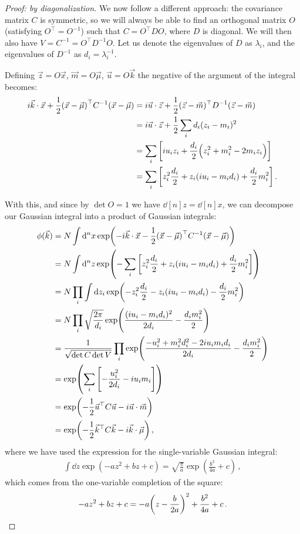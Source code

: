 \documentclass[main.tex]{subfiles}
\begin{document}
\begin{proof}[Proof: by diagonalization]
We now follow a different approach: the covariance matrix \(C\) is symmetric, so we will always be able to find an orthogonal matrix \(O\) (satisfying \(O^{\top} = O^{-1}\)) such that \(C = O^{\top} D O\), where \(D\) is diagonal. 
We will then also have \(V = C^{-1} = O^{\top} D^{-1} O\).
Let us denote the eigenvalues of \(D\) as \(\lambda _i\), and the eigenvalues of \(D^{-1}\) as \(d_i = \lambda _i^{-1}\).

Defining \(\vec{z} = O \vec{x}\), \(\vec{m} = O \vec{\mu}\), \(\vec{u} = O \vec{k}\) the negative of the argument of the integral becomes:
%
\begin{align}
 i \vec{k} \cdot \vec{x} 
 + \frac{1}{2}
\qty(\vec{x} - \vec{\mu})^{\top} C^{-1} 
\qty(\vec{x} - \vec{\mu}) &=
 i \vec{u} \cdot \vec{z} 
+ \frac{1}{2} (\vec{z} - \vec{m})^{\top} D^{-1} (\vec{z} - \vec{m})  \\
&= 
i \vec{u} \cdot \vec{z} 
+ \frac{1}{2} \sum _{i} d_i (z_i - m_i)^2   \\
&= \sum _{i} \qty[i u_i z_i + \frac{d_i}{2} \qty(z_i^2 + m_i^2 - 2 m_i z_i)]  \\
&= \sum _{i} \qty[z_i^2 \frac{d_i}{2} + z_i \qty(i u_i - m_i d_i) + \frac{d_i}{2} m_i^2]
\,.
\end{align}

With this, and since by \(\det O = 1\) we have \(\dd[n]{z} = \dd[n]{x}\), we can decompose our Gaussian integral into a product of Gaussian integrals:
%
\begin{align}
\phi (\vec{k}) &= 
N \int \dd[n]{x} \exp(-  i \vec{k} \cdot \vec{x} 
 - \frac{1}{2}
\qty(\vec{x} - \vec{\mu})^{\top} C^{-1} 
\qty(\vec{x} - \vec{\mu}))  \\
&= N \int \dd[n]{z} \exp(- \sum _{i} \qty[z_i^2 \frac{d_i}{2} + z_i \qty(i u_i - m_i d_i) + \frac{d_i}{2} m_i^2])  \\
&= N \prod_i \int \dd{z_i}
\exp(- z_i^2 \frac{d_i}{2} - z_i \qty(i u_i - m_i d_i) - \frac{d_i}{2} m_i^2)  \\
&= N \prod_i \sqrt{\frac{2\pi }{d_i}} \exp(\frac{(i u_i - m_i d_i)^2}{2 d_i} - \frac{d_im_i^2}{2}) \\
&= \frac{1}{\sqrt{\det C \det V}} \prod_i \exp(\frac{- u_i^2 + m_i^2 d_i^2 - 2 i u_i m_i d_i }{2 d_i} - \frac{d_i m_i^2}{2}) \\
&= \exp(\sum _{i} \qty[- \frac{u_i^2}{2d_i} - i u_i m_i])  \\
&= \exp(- \frac{1}{2} \vec{u}^{\top} C \vec{u} - i \vec{u} \cdot \vec{m})  \\
&= \exp(- \frac{1}{2} \vec{k}^{\top} C \vec{k} - i \vec{k} \cdot \vec{\mu })
\,,
\end{align}
%
where we have used the expression for the single-variable Gaussian integral: 
%
\begin{align}
\int \dd{z} \exp(- a z^2 + bz + c) = \sqrt{ \frac{\pi}{a}} \exp( \frac{b^2}{4 a} + c)
\,,
\end{align}
%
which comes from the one-variable completion of the square: 
%
\begin{align}
-az^2 + bz + c = -a \qty(z - \frac{b}{2a})^2 + \frac{b^2}{4a} + c
\,.
\end{align}


\end{proof}
\end{document}
